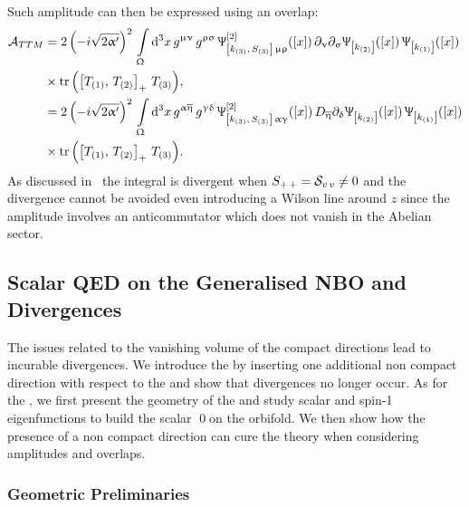 Such amplitude can then be expressed using an overlap:
\begin{equation}
  \begin{split}
    \mathcal{A}_{TTM}
    & =
    2\, \qty(-i \sqrt{2 \upalpha'} )^2\,
    \int\limits_{\Upomega} \dd^3x\,
    g^{\upmu\upnu}\, g^{\uprho\upsigma}\,
    \Uppsi^{[2]}_{\qty[k_{\qty(3)},\, S_{\qty(3)}]\, \upmu\uprho}\qty(\qty[x])\,
    \partial_{\upnu}\partial_{\upsigma} \Uppsi_{\qty[k_{\qty(2)}] }\qty(\qty[x])\,
    \Uppsi_{\qty[k_{\qty(1)}] }\qty(\qty[x])
    \\
    & \times
    \tr\qty( \left[ T_{\qty(1)},\, T_{\qty(2)} \right]_+\, T_{\qty(3)}),
    \\
    & =
    2\, \qty(-i \sqrt{2 \upalpha'} )^2\,
    \int\limits_{\Upomega} \dd^3x\,
    g^{\upalpha\overline{\upeta}}\, g^{\upgamma\updelta}\,
    \Uppsi^{[2]}_{\qty[k_{\qty(3)},\, S_{\qty(3)}]\, \upalpha\upgamma}\qty(\qty[x])\,
    D_{\overline{\upeta}} \partial_{\updelta} \Uppsi_{\qty[k_{\qty(2)}] }\qty(\qty[x])\,
    \Uppsi_{\qty[k_{\qty(1)}] }\qty(\qty[x])
    \\
    & \times
    \tr\qty( \left[ T_{\qty(1)},\, T_{\qty(2)} \right]_+\, T_{\qty(3)} ).
  \end{split}
\end{equation}
As discussed in~ the integral is divergent when $S_{+\, +} =\mathcal{S}_{v\, v} \neq 0$ and the divergence cannot be avoided even introducing a Wilson line around $z$ since the amplitude involves an anticommutator which does not vanish in the Abelian sector.


\subsection{Scalar QED on the Generalised NBO and Divergences}
\label{sect:genNOscalarQED}

The issues related to the vanishing volume of the compact directions lead to incurable divergences.
We introduce the \gnbo by inserting one additional non compact direction with respect to the \nbo and show that divergences no longer occur.
As for the \nbo, we first present the geometry of the \gnbo and study scalar and spin-1 eigenfunctions to build the scalar \qed on the orbifold.
We then show how the presence of a non compact direction can cure the theory when considering amplitudes and overlaps.


\subsubsection{Geometric Preliminaries}


